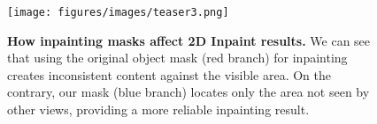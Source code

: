 \begin{figure}[t]
	\centering
	\texttt{[image: figures/images/teaser3.png]}
    \caption{\textbf{How inpainting masks affect 2D Inpaint results.} We can see that using the original object mask (red branch) for inpainting creates inconsistent content against the visible area. On the contrary, our mask (blue branch) locates only the area not seen by other views, providing a more reliable inpainting result.
    }
    \vspace{-1mm}
	\label{fig:mask_diff}
\end{figure}

